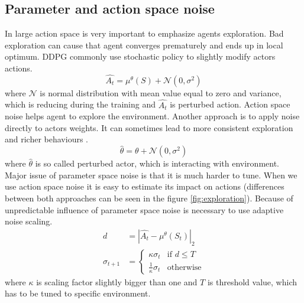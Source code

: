 \subsection{Parameter and action space noise}
In large action space is very important to emphasize agents exploration. Bad exploration can cause that agent converges prematurely and ends up in local optimum. DDPG commonly use stochastic policy to slightly modify actors actions.
\begin{equation} \label{eq:exploration}
\hat{A_t} = \mu^\theta(S) + \mathcal{N}(0, \sigma^2)
\end{equation}
where $\mathcal{N}$ is normal distribution with mean value equal to zero and variance, which is reducing during the training and $\hat{A_t}$ is perturbed action. Action space noise helps agent to explore the environment. Another approach is to apply noise directly to actors weights. It can sometimes lead to more consistent exploration and richer behaviours \cite{plappert2017}.
\begin{equation}
\hat{\theta} = \theta + \mathcal{N}(0, \sigma^2)
\end{equation}
where $\hat{\theta}$ is so called perturbed actor, which is interacting with environment. 
\clearpage
Major issue of parameter space noise is that it is much harder to tune. When we use action space noise it is easy to estimate its impact on actions (differences between both approaches can be seen in the figure \ref{fig:exploration}). Because of unpredictable influence of parameter space noise is necessary to use adaptive noise scaling.
\begin{align}
d &= |\hat{A_t} - \mu^\theta(S_t)|_2  \\
\sigma_{t+1} &= 
     \begin{cases}
       \kappa \sigma_t & \text{if } d \leq T \\
       \frac{1}{\kappa}\sigma_t & \text{otherwise}
     \end{cases}
\end{align}
where $\kappa$ is scaling factor slightly bigger than one and $T$ is threshold value, which has to be tuned to specific environment.

